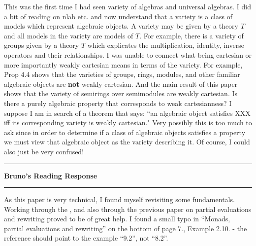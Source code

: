 \documentclass{amsart}
\newcommand{\iam}[1]{
  \vspace{0.25em}
  \hrule
  \vspace{0.25em}
  \textbf{{#1}'s Reading Response}
  \vspace{0.25em}
  \hrule
  \vspace{1em}
}
\begin{document}
This was the first time I had seen variety of algebras and universal algebras. I did a bit of reading on nlab etc. and now understand that a variety is a class of models which represent algebraic objects. A variety may be given by a theory $T$ and all models in the variety are models of $T$. For example, there is a variety of groups given by a theory $T$ which explicates the multiplication, identity, inverse operators and their relationships. I was unable to connect what being cartesian or more importantly weakly cartesian means in terms of the variety. For example, Prop 4.4 shows that the varieties of groups, rings, modules, and other familiar algebraic objects are {\bf not} weakly cartesian. And the main result of this paper shows that the variety of semirings over semimodules are weakly cartesian. Is there a purely algebraic property that corresponds to weak cartesianness? I suppose I am in search of a theorem that says: ``an algebraic object satisfies XXX iff its corresponding variety is weakly cartesian."
Very possibly this is too much to ask since in order to determine if a class of
algebraic objects satisfies a property we must view that algebraic object as the
variety describing it. Of course, I could also just be very confused!


\iam{Bruno}

As this paper is very technical, I found myself revisiting some fundamentals.
Working through the , and also through the previous
paper on partial evaluations and rewriting proved to be of great help.
I found a small typo in ``Monads, partial evaluations and rewriting'' on the
bottom of page 7., Example 2.10. - the reference should point to the example
``9.2'', not ``8.2''.
\end{document}
